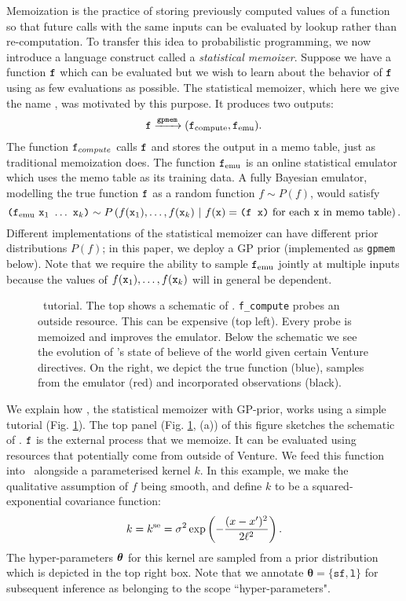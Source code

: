 Memoization is the practice of storing previously computed values of a function so that future calls with the same inputs can be evaluated by lookup rather than re-computation.
To transfer this idea to probabilistic programming, we now introduce a language construct called a
\emph{statistical memoizer}.  Suppose we have a function $\texttt{f}$ which can be evaluated 
but we wish to learn about the behavior of $\texttt{f}$ using as
few evaluations as possible.  The statistical memoizer, which here we give the
name \gpmem, was motivated by this purpose.  It produces two outputs:
\[ \texttt{f} \xrightarrow{\texttt{gpmem}} (\texttt{f}_{\text{compute}}, \texttt{f}_{\textrm{emu}}). \]
The function $\texttt{f}_{compute}$ calls $\texttt{f}$ and stores the output in a memo
table, just as traditional memoization does.  The function $\texttt{f}_{\textrm{emu}}$ is
an online statistical emulator which uses the memo table as its training
data.  A fully Bayesian emulator, modelling the true function $\texttt{f}$ as a
random function $f \sim P(f)$, would satisfy
\[
\texttt{(}\ftt_\emu\ \xtt_1\ \ldots\ \xtt_k\texttt{)}
\sim
P\pn{
  f(\xtt_1), \ldots, f(\xtt_k)
  \mvert
  \text{$f(\xtt) = \texttt{(f x)}$ for each $\xtt$ in memo table}
}.
\]
Different implementations of the statistical memoizer can have
different prior distributions $P(f)$; in this paper, we deploy a \ac{GP} 
prior (implemented as \texttt{gpmem} below).  Note that we require the ability
to sample $\texttt{f}_{\textrm{emu}}$ jointly at multiple inputs because the values of
$f(\texttt{x}_1),\ldots,f(\texttt{x}_k)$ will in general be dependent.


\begin{figure}
\noindent
\captionsetup{aboveskip=-3pt}
\caption{\footnotesize \gpmem\ tutorial. The top shows a schematic of \gpmem.
  \texttt{f\_compute} probes an outside resource.
  This can be expensive (top left).
  Every probe is memoized and improves the emulator. Below the schematic we see the evolution
  of \gpmem's state of believe of the world given certain Venture
  directives. On the right, we depict the true function (blue), samples from the
emulator (red) and incorporated observations (black).}
\label{fig:gpmem_tutorial}
\end{figure}

We explain how \gpmem, the statistical memoizer with \ac{GP}-prior, works using a simple tutorial
(Fig. \ref{fig:gpmem_tutorial}). 
The top panel (Fig. \ref{fig:gpmem_tutorial}, (a)) of this figure sketches the schematic of \gpmem.
$\texttt{f}$ is the external process that we memoize. It can be evaluated using resources that potentially come
from outside of Venture.  
We feed this function into \gpmem\ alongside
a parameterised kernel $k$.  
In this example, we make the qualitative assumption of $f$ being smooth, and define
$k$ to be a squared-exponential covariance function:
\[
k = k^\text{se} = \sigma^2 \exp \left(-\frac{(x-x^\prime)^2}{2\ell^2} \right).
\]
The hyper-parameters $\bm{\theta}$ for this kernel are sampled from a 
prior distribution which is depicted in the top right box.
Note that we annotate $\bm{\theta}=\{\texttt{sf},\texttt{l}\}$ for subsequent
inference as belonging to the scope ``hyper-parameters".

